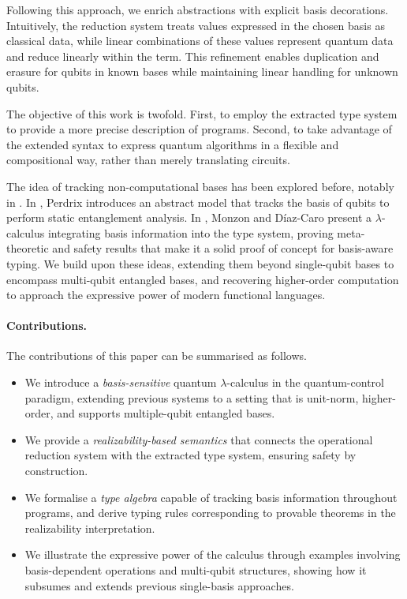 \documentclass[runningheads,orivec]{llncs}
\begin{document}
Following this approach, we enrich abstractions with explicit basis
decorations. Intuitively, the reduction system treats values expressed in the
chosen basis as classical data, while linear combinations of these values
represent quantum data and reduce linearly within the term. This refinement
enables duplication and erasure for qubits in known bases while maintaining
linear handling for unknown qubits.

The objective of this work is twofold. First, to employ the extracted type
system to provide a more precise description of programs. Second, to take
advantage of the extended syntax to express quantum algorithms in a flexible
and compositional way, rather than merely translating circuits.

The idea of tracking non-computational bases has been explored before, notably
in \cite{Perdrix2008,DiazcaroMonzonAPLAS25}. In \cite{Perdrix2008}, Perdrix
introduces an abstract model that tracks the basis of qubits to perform static
entanglement analysis. In \cite{DiazcaroMonzonAPLAS25}, Monzon and Díaz-Caro
present a $\lambda$-calculus integrating basis information into the type system,
proving meta-theoretic and safety results that make it a solid proof of concept
for basis-aware typing. We build upon these ideas, extending them beyond
single-qubit bases to encompass multi-qubit entangled bases, and recovering
higher-order computation to approach the expressive power of modern functional
languages.

\paragraph{Contributions.}
The contributions of this paper can be summarised as follows.
\begin{itemize}
  \item We introduce a \emph{basis-sensitive} quantum $\lambda$-calculus in the
  quantum-control paradigm, extending previous systems to a setting that is
  unit-norm, higher-order, and supports multiple-qubit entangled bases.
  \item We provide a \emph{realizability-based semantics} that connects the
  operational reduction system with the extracted type system, ensuring safety
  by construction.
  \item We formalise a \emph{type algebra} capable of tracking basis
  information throughout programs, and derive typing rules corresponding to
  provable theorems in the realizability interpretation.
  \item We illustrate the expressive power of the calculus through examples
  involving basis-dependent operations and multi-qubit structures, showing how
  it subsumes and extends previous single-basis approaches.
\end{itemize}
\end{document}
